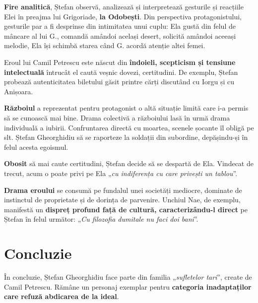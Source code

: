 \documentclass{article}
\newcommand{\qu}[1]{„\emph{#1}”}
\begin{document}
\textbf{Fire analitică}, Ștefan observă, analizează și interpretează gesturile și reacțiile Elei în preajma lui Grigoriade, \textbf{la Odobești}. Din perspectiva protagonistului, gesturile par a fi desprinse din intimitatea unui cuplu: Ela gustă din felul de mâncare al lui G., comandă amândoi același desert, solicită amândoi aceeași melodie, Ela își schimbă starea când G. acordă atenție altei femei.

Eroul lui Camil Petrescu este născut din \textbf{îndoieli, scepticism și tensiune intelectuală} întrucât el caută veșnic dovezi, certitudini. De exemplu, Ștefan probează autenticitatea biletului găsit printre cărți discutând cu Iorgu și cu Anișoara.

\textbf{Războiul} a reprezentat pentru protagonist o altă situație limită care i-a permis să se cunoască mai bine. Drama colectivă a războiului lasă în urmă drama individuală a iubirii. Confruntarea directă cu moartea, scenele șocante îl obligă pe slt. Ștefan Gheorghidiu să se raporteze la soldații din subordine, depășindu-și în felul acesta egoismul.

\textbf{Obosit} să mai caute certitudini, Ștefan decide să se despartă de Ela. Vindecat de trecut, acum o poate privi pe Ela \qu{cu indiferența cu care privești un tablou}.

\textbf{Drama eroului} se consumă pe fundalul unei societăți mediocre, dominate de instinctul de proprietate și de dorința de parvenire. Unchiul Nae, de exemplu, manifestă un \textbf{dispreț profund față de cultură, caracterizându-l direct} pe Ștefan în felul următor: \qu{Cu filozofia dumitale nu faci doi bani}.
\section{Concluzie}
În concluzie, Ștefan Gheorghidiu face parte din familia \qu{sufletelor tari}, create de Camil Petrescu. Rămâne un personaj exemplar pentru \textbf{categoria inadaptaților care refuză abdicarea de la ideal}.
\end{document}
